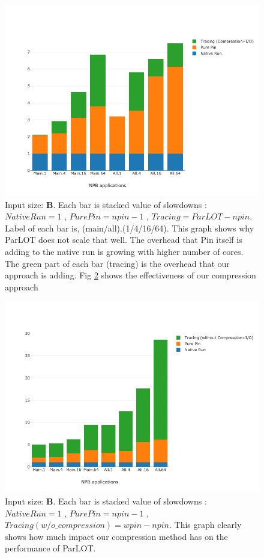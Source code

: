 \begin{figure}[!t]
\centering
\includegraphics[width=5in]{figs.psc/chartDet_B_wc_byTool_p3_5.png}
\caption{ Input size: \textbf{B}. Each bar is stacked value of slowdowns : $Native Run = 1$ , $Pure Pin = npin - 1$ , $Tracing = ParLOT - npin$. Label of each bar is, (main/all).(1/4/16/64). This graph shows why ParLOT does not scale that well. The overhead that Pin itself is adding to the native run is growing with higher number of cores. The green part of each bar (tracing) is the overhead that our approach is adding. Fig \ref{chartDet_B_woc_byTool_p3_5} shows the effectiveness of our compression approach}
\label{chartDet_B_wc_byTool_p3_5}
\end{figure}



\begin{figure}[!t]
\centering
\includegraphics[width=5in]{figs.psc/chartDet_B_woc_byTool_p3_5.png}
\caption{ Input size: \textbf{B}. Each bar is stacked value of slowdowns : $Native Run = 1$ , $Pure Pin = npin - 1$ , $Tracing (w/o \_compression) = wpin - npin$.
This graph clearly shows how much impact our compression method has on the performance of ParLOT.
}
\label{chartDet_B_woc_byTool_p3_5}
\end{figure}


